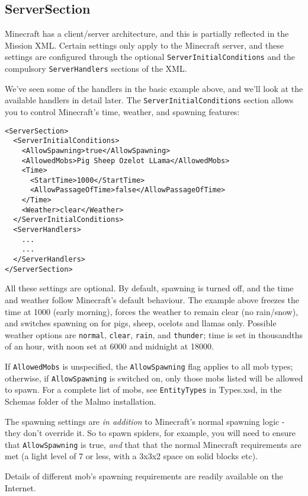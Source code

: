 \documentclass[11pt]{article} %
\begin{document}
\subsection{ServerSection}

Minecraft has a client/server architecture, and this is partially reflected in the Mission XML. Certain settings only apply to the Minecraft server, and these settings are configured through the optional \lstinline!ServerInitialConditions! and the compulsory \lstinline!ServerHandlers! sections of the XML.

We've seen some of the handlers in the basic example above, and we'll look at the available handlers in detail later. The \lstinline!ServerInitialConditions! section allows you to control Minecraft's time, weather, and spawning features:

\begin{lstlisting}[frame=lines]
<ServerSection>
  <ServerInitialConditions>
    <AllowSpawning>true</AllowSpawning>
    <AllowedMobs>Pig Sheep Ozelot LLama</AllowedMobs>
    <Time>
      <StartTime>1000</StartTime>
      <AllowPassageOfTime>false</AllowPassageOfTime>
    </Time>
    <Weather>clear</Weather>
  </ServerInitialConditions>
  <ServerHandlers>
    ...
    ...
  </ServerHandlers>
</ServerSection>
\end{lstlisting}

All these settings are optional. By default, spawning is turned off, and the time and weather follow Minecraft's default behaviour. The example above freezes the time at 1000 (early morning), forces the weather to remain clear (no rain/snow), and switches spawning on for pigs, sheep, ocelots and llamas only. Possible weather options are \lstinline!normal!, \lstinline!clear!, \lstinline!rain!, and \lstinline!thunder!; time is set in thousandths of an hour, with noon set at 6000 and midnight at 18000.

If \lstinline!AllowedMobs! is unspecified, the \lstinline!AllowSpawning! flag applies to all mob types; otherwise, if \lstinline!AllowSpawning! is switched on, only those mobs listed will be allowed to spawn. For a complete list of mobs, see \lstinline!EntityTypes! in Types.xsd, in the Schemas folder of the Malmo installation.

\begin{mdframed}[style=tipFrame]
The spawning settings are \emph{in addition} to Minecraft's normal spawning logic - they don't override it. So to spawn spiders, for example, you will need to ensure that \lstinline!AllowSpawning! is true, \emph{and} that  that the normal Minecraft requirements are met (a light level of 7 or less, with a 3x3x2 space on solid blocks etc).

Details of different mob's spawning requirements are readily available on the Internet.
\end{mdframed}
 
\end{document}
